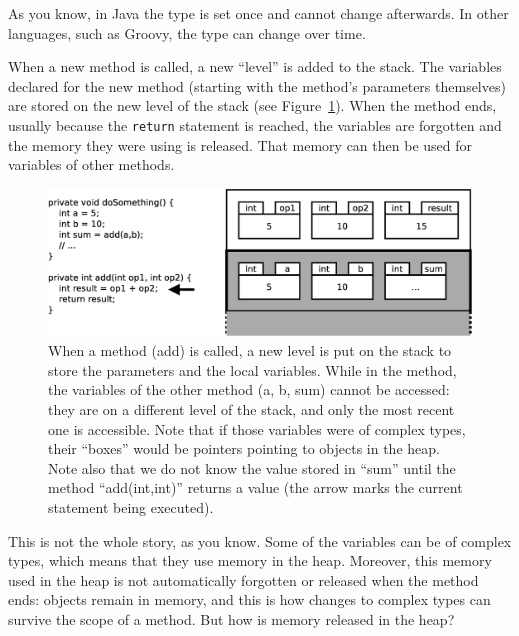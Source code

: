 As you know, in Java the type is set once 
and cannot change afterwards.
In other languages, such as Groovy, the type
can change over time. 

When a new method is called, a new ``level'' is added to the stack. The
variables declared for the new method (starting with the 
method's parameters themselves)
are stored on the new level of the
stack (see Figure~\ref{fig:stackparameter}). 
When the method ends, usually because the \verb+return+
statement is reached, the variables are forgotten and the memory they
were using is released. That memory can then be used for variables of
other methods.

\begin{figure}[bhtp]
  \centering
  \includegraphics[width=\textwidth]{gfx/parameter-stack}
  \caption{When a method (add) is called, a new level is put on the
    stack to store the parameters and the local variables. While in
    the method, the variables of the other method (a, b, sum) cannot
    be accessed: they are on a different level of the stack, and only
    the most recent one is accessible. Note that if those variables
    were of complex types, their ``boxes'' would be pointers pointing
    to objects in the heap. Note also that we do not know the value
    stored in ``sum'' until the method ``add(int,int)'' returns a
    value (the arrow marks the current statement being executed).}
  \label{fig:stackparameter}
\end{figure}

This is not the whole story, as you know. Some of the variables can
be of complex types, which means that they use memory in the
heap. Moreover, this memory used in the heap is not automatically
forgotten or released when the method ends: objects remain in memory,
and this is how changes to complex types can survive the scope of a
method. But how is memory released in the heap?

